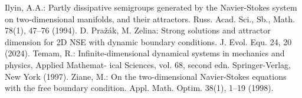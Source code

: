 \documentclass[12pt]{article}
\begin{document}
\begin{thebibliography}{10}

 Ilyin, A.A.: Partly dissipative semigroups generated by the Navier-Stokes system on two-dimensional manifolds, and their attractors. Russ. Acad. Sci., Sb., Math. 78(1), 47–76 (1994).
 D. Pražák, M. Zelina: Strong solutions and attractor dimension for 2D NSE with dynamic boundary conditions. J. Evol. Equ. 24, 20 (2024). 
 Temam, R.: Infinite-dimensional dynamical systems in mechanics and physics, Applied Mathemat- ical Sciences, vol. 68, second edn. Springer-Verlag, New York (1997).
 Ziane, M.: On the two-dimensional Navier-Stokes equations with the free boundary condition. Appl. Math. Optim. 38(1), 1–19 (1998).


\end{thebibliography}
\end{document}
